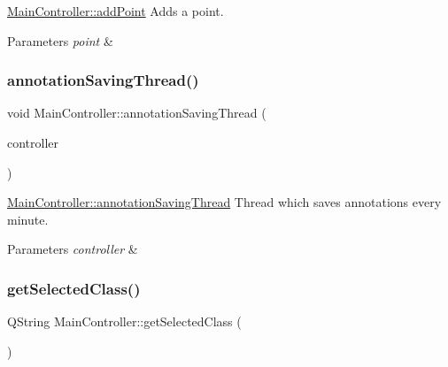 \hyperlink{classMainController_a215cb23587a572993fb00b0c09a393e2}{Main\+Controller\+::add\+Point} Adds a point. 


\begin{DoxyParams}{Parameters}
{\em point} & \\
\hline
\end{DoxyParams}
\mbox{\label{classMainController_ae4fbe8a429f2181ae8e6c721ea7b113b}} 
\subsubsection{\texorpdfstring{annotation\+Saving\+Thread()}{annotationSavingThread()}}
{\footnotesize\ttfamily void Main\+Controller\+::annotation\+Saving\+Thread (\begin{DoxyParamCaption}\item[{\hyperlink{classMainController}{Main\+Controller} $\ast$}]{controller }\end{DoxyParamCaption})\hspace{0.3cm}{\ttfamily [static]}}



\hyperlink{classMainController_ae4fbe8a429f2181ae8e6c721ea7b113b}{Main\+Controller\+::annotation\+Saving\+Thread} Thread which saves annotations every minute. 


\begin{DoxyParams}{Parameters}
{\em controller} & \\
\hline
\end{DoxyParams}
\mbox{\label{classMainController_a1ffca82d85f234d7427385dd28bb2160}} 
\subsubsection{\texorpdfstring{get\+Selected\+Class()}{getSelectedClass()}}
{\footnotesize\ttfamily Q\+String Main\+Controller\+::get\+Selected\+Class (\begin{DoxyParamCaption}{ }\end{DoxyParamCaption})\hspace{0.3cm}{\ttfamily [private]}}



